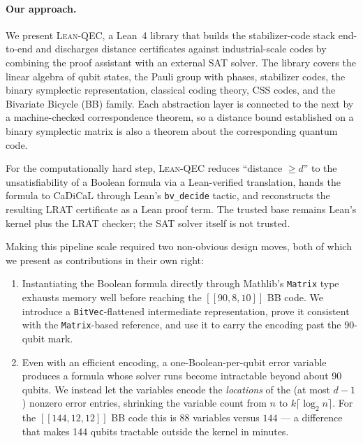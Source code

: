 \paragraph{Our approach.} We present \textsc{Lean-QEC}, a Lean~4 library that
builds the stabilizer-code stack end-to-end and discharges distance certificates
against industrial-scale codes by combining the proof assistant with an external
SAT solver. The library covers the linear algebra of qubit states, the Pauli
group with phases, stabilizer codes, the binary symplectic representation,
classical coding theory, CSS codes, and the Bivariate Bicycle (BB) family. Each
abstraction layer is connected to the next by a machine-checked correspondence
theorem, so a distance bound established on a binary symplectic matrix is also a
theorem about the corresponding quantum code.

For the computationally hard step, \textsc{Lean-QEC} reduces ``distance $\geq
d$'' to the unsatisfiability of a Boolean formula via a Lean-verified
translation, hands the formula to CaDiCaL through Lean's \lstinline{bv_decide}
tactic, and reconstructs the resulting LRAT certificate as a Lean proof term.
The trusted base remains Lean's kernel plus the LRAT checker; the SAT solver
itself is not trusted.

Making this pipeline scale required two non-obvious design moves, both of which
we present as contributions in their own right:
\begin{enumerate}[leftmargin=1.5em]
    \item Instantiating the Boolean formula directly through Mathlib's
    \lstinline{Matrix} type exhausts memory well before reaching the
    $[[90,8,10]]$ BB code. We introduce a \lstinline{BitVec}-flattened
    intermediate representation, prove it consistent with the
    \lstinline{Matrix}-based reference, and use it to carry the encoding past the 90-qubit mark.
    \item Even with an efficient encoding, a one-Boolean-per-qubit error
    variable produces a formula whose solver runs become intractable beyond
    about 90 qubits. We instead let the variables encode the \emph{locations} of
    the (at most $d-1$) nonzero error entries, shrinking the variable count from
    $n$ to $k\lceil\log_2 n\rceil$. For the $[[144,12,12]]$ BB code this is $88$
    variables versus $144$ --- a difference that makes 144 qubits tractable
    outside the kernel in minutes.
\end{enumerate}

